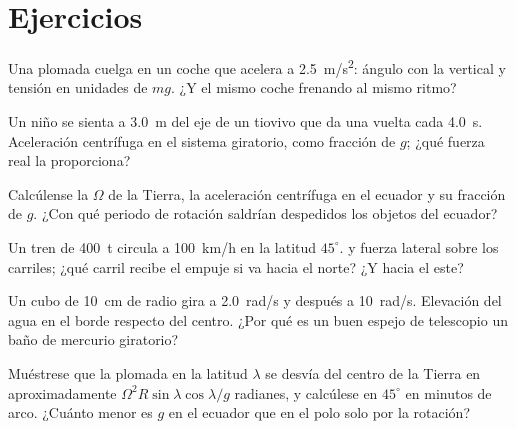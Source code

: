 \section{Ejercicios}

\begin{exercise}[$\star$]\label{exo:b1:non-inertial-frames:1}
Una plomada cuelga en un coche que acelera a \qty{2.5}{m/s^2}: ángulo con
la vertical y tensión en unidades de $mg$. ¿Y el mismo coche frenando al
mismo ritmo?
\end{exercise}

\begin{exercise}[$\star$]\label{exo:b1:non-inertial-frames:2}
Un niño se sienta a \qty{3.0}{m} del eje de un tiovivo que da una vuelta
cada \qty{4.0}{s}. Aceleración centrífuga en el sistema giratorio, como
fracción de $g$; ¿qué fuerza real la proporciona?
\end{exercise}

\begin{exercise}[$\star$]\label{exo:b1:non-inertial-frames:3}
Calcúlense la  $\Omega$ de la Tierra, la aceleración
centrífuga en el ecuador y su fracción de $g$. ¿Con qué periodo de
rotación saldrían despedidos los objetos del ecuador?
\end{exercise}

\begin{exercise}[$\star$]\label{exo:b1:non-inertial-frames:4}
Un tren de \qty{400}{t} circula a \qty{100}{km/h} en la latitud $45^\circ$.
 y fuerza lateral sobre los carriles; ¿qué carril
recibe el empuje si va hacia el norte? ¿Y hacia el este?
\end{exercise}

\begin{exercise}[$\star\star$]\label{exo:b1:non-inertial-frames:5}
Un cubo de \qty{10}{cm} de radio gira a \qty{2.0}{rad/s} y después a
\qty{10}{rad/s}. Elevación del agua en el borde respecto del centro. ¿Por
qué es un buen espejo de telescopio un baño de mercurio giratorio?
\end{exercise}

\begin{exercise}[$\star\star$]\label{exo:b1:non-inertial-frames:6}
Muéstrese que la plomada en la latitud $\lambda$ se desvía del centro de
la Tierra en aproximadamente $\Omega^2R\sin\lambda\cos\lambda/g$ radianes, y
calcúlese en $45^\circ$ en minutos de arco. ¿Cuánto menor es $g$ en el
ecuador que en el polo solo por la rotación?
\end{exercise}

